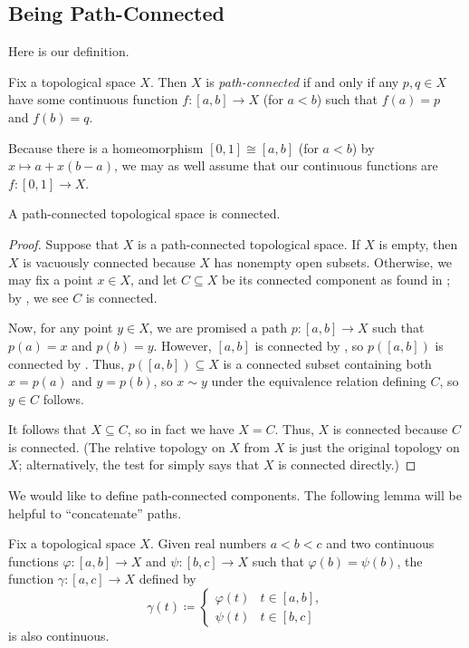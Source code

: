 \documentclass[../notes.tex]{subfiles}
\begin{document}
\subsection{Being Path-Connected}
Here is our definition.
\begin{definition}
	Fix a topological space $X$. Then $X$ is \textit{path-connected} if and only if any $p,q\in X$ have some continuous function $f\colon[a,b]\to X$ (for $a<b$) such that $f(a)=p$ and $f(b)=q$.
\end{definition}
\begin{remark}
	Because there is a homeomorphism $[0,1]\cong[a,b]$ (for $a<b$) by $x\mapsto a+x(b-a)$, we may as well assume that our continuous functions are $f\colon[0,1]\to X$.
\end{remark}
\begin{lemma} \label{lem:path-conn-to-conn}
	A path-connected topological space is connected.
\end{lemma}
\begin{proof}
	Suppose that $X$ is a path-connected topological space. If $X$ is empty, then $X$ is vacuously connected because $X$ has nonempty open subsets. Otherwise, we may fix a point $x\in X$, and let $C\subseteq X$ be its connected component as found in ; by , we see $C$ is connected.

	Now, for any point $y\in X$, we are promised a path $p\colon[a,b]\to X$ such that $p(a)=x$ and $p(b)=y$. However, {$[a,b]$ is connected by , so $p([a,b])$ is connected by }. Thus, $p([a,b])\subseteq X$ is a connected subset containing both $x=p(a)$ and $y=p(b)$, so $x\sim y$ under the equivalence relation defining $C$, so $y\in C$ follows.

	It follows that $X\subseteq C$, so in fact we have $X=C$. Thus, $X$ is connected because $C$ is connected. (The relative topology on $X$ from $X$ is just the original topology on $X$; alternatively, the test for  simply says that $X$ is connected directly.)
\end{proof}
We would like to define path-connected components. The following lemma will be helpful to ``concatenate'' paths.
\begin{lemma} \label{lem:concatpath}
	Fix a topological space $X$. Given real numbers $a<b<c$ and two continuous functions $\varphi\colon[a,b]\to X$ and $\psi\colon[b,c]\to X$ such that $\varphi(b)=\psi(b)$, the function $\gamma\colon[a,c]\to X$ defined by
	\[\gamma(t)\coloneqq\begin{cases}
		\varphi(t) & t\in[a,b], \\
		\psi(t) & t\in[b,c]
	\end{cases}\]
	is also continuous.
\end{lemma}
\end{document}
